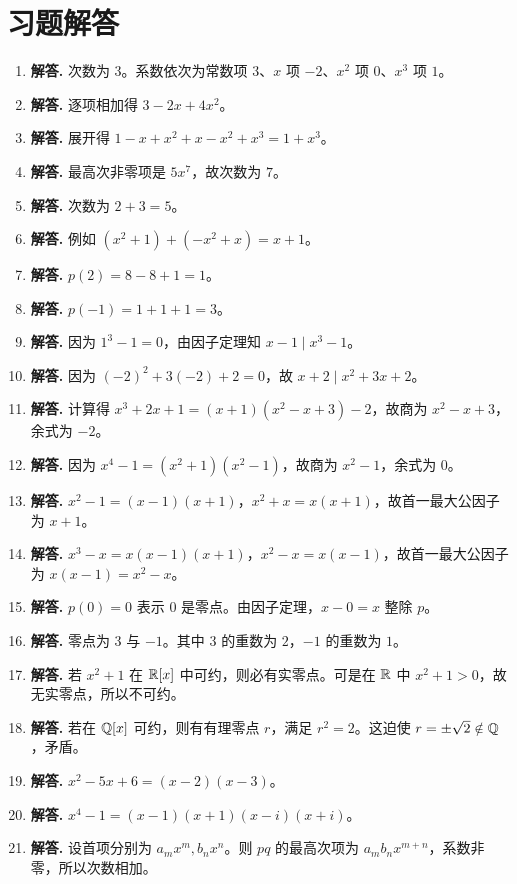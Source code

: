 \section*{习题解答}
\begin{enumerate}[label=\textbf{\arabic*.}, leftmargin=*, itemsep=1em]
\item \textbf{解答.} 次数为 $3$。系数依次为常数项 $3$、$x$ 项 $-2$、$x^2$ 项 $0$、$x^3$ 项 $1$。
\item \textbf{解答.} 逐项相加得 $3-2x+4x^2$。
\item \textbf{解答.} 展开得 $1-x+x^2+x-x^2+x^3=1+x^3$。
\item \textbf{解答.} 最高次非零项是 $5x^7$，故次数为 $7$。
\item \textbf{解答.} 次数为 $2+3=5$。
\item \textbf{解答.} 例如 $(x^2+1)+(-x^2+x)=x+1$。
\item \textbf{解答.} $p(2)=8-8+1=1$。
\item \textbf{解答.} $p(-1)=1+1+1=3$。
\item \textbf{解答.} 因为 $1^3-1=0$，由因子定理知 $x-1\mid x^3-1$。
\item \textbf{解答.} 因为 $(-2)^2+3(-2)+2=0$，故 $x+2\mid x^2+3x+2$。
\item \textbf{解答.} 计算得 $x^3+2x+1=(x+1)(x^2-x+3)-2$，故商为 $x^2-x+3$，余式为 $-2$。
\item \textbf{解答.} 因为 $x^4-1=(x^2+1)(x^2-1)$，故商为 $x^2-1$，余式为 $0$。
\item \textbf{解答.} $x^2-1=(x-1)(x+1)$，$x^2+x=x(x+1)$，故首一最大公因子为 $x+1$。
\item \textbf{解答.} $x^3-x=x(x-1)(x+1)$，$x^2-x=x(x-1)$，故首一最大公因子为 $x(x-1)=x^2-x$。
\item \textbf{解答.} $p(0)=0$ 表示 $0$ 是零点。由因子定理，$x-0=x$ 整除 $p$。
\item \textbf{解答.} 零点为 $3$ 与 $-1$。其中 $3$ 的重数为 $2$，$-1$ 的重数为 $1$。
\item \textbf{解答.} 若 $x^2+1$ 在 $\mathbb{R}[x]$ 中可约，则必有实零点。可是在 $\mathbb{R}$ 中 $x^2+1>0$，故无实零点，所以不可约。
\item \textbf{解答.} 若在 $\mathbb{Q}[x]$ 可约，则有有理零点 $r$，满足 $r^2=2$。这迫使 $r=\pm\sqrt2\notin\mathbb{Q}$，矛盾。
\item \textbf{解答.} $x^2-5x+6=(x-2)(x-3)$。
\item \textbf{解答.} $x^4-1=(x-1)(x+1)(x-i)(x+i)$。
\item \textbf{解答.} 设首项分别为 $a_mx^m,b_nx^n$。则 $pq$ 的最高次项为 $a_mb_nx^{m+n}$，系数非零，所以次数相加。

\end{enumerate}
